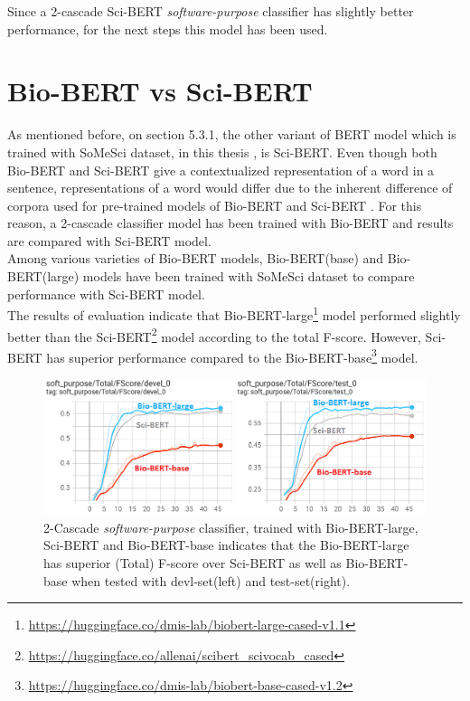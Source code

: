 Since a 2-cascade Sci-BERT \emph{software-purpose} classifier has slightly better performance, for the next steps this model has been used. \\

\section{Bio-BERT vs Sci-BERT}
\label{sec:chapter06:biosci}

As mentioned before, on section 5.3.1, the other variant of BERT model which is trained with SoMeSci dataset, in this thesis , is Sci-BERT. Even though both \ac{Bio-BERT} and \ac{Sci-BERT} give a contextualized representation of a word in a sentence, representations of a word would differ due to the inherent difference of corpora used for pre-trained models of Bio-BERT and Sci-BERT \citep{beltagy2019scibert,li2019fine}. For this reason, a 2-cascade classifier model has been trained with Bio-BERT and results are compared with Sci-BERT model. \\

Among various varieties of Bio-BERT models, Bio-BERT(base) and Bio-BERT(large) models have been trained with SoMeSci dataset to compare performance with Sci-BERT model. \\

The results of evaluation indicate that  Bio-BERT-large\footnote{\url{https://huggingface.co/dmis-lab/biobert-large-cased-v1.1}} model performed slightly better than the Sci-BERT\footnote{\url{https://huggingface.co/allenai/scibert_scivocab_cased}} model according to the total F-score. However, Sci-BERT has superior performance compared to the Bio-BERT-base\footnote{\url{https://huggingface.co/dmis-lab/biobert-base-cased-v1.2}} model. \\

\begin{figure}[htbp]
	\centering
	\includegraphics[width=1\textwidth]{4.graphics/figures/ch_6/6.BIoBERT_vs_SCIBERT_2LAYER_Classifier/HD/BIobert-large-small-cybert}
	\caption{2-Cascade \emph{software-purpose} classifier, trained with Bio-BERT-large, Sci-BERT and Bio-BERT-base indicates that the Bio-BERT-large has superior (Total) F-score over Sci-BERT as well as Bio-BERT-base when tested with devl-set(left) and test-set(right).}
	\label{fig:chapter06:with}
\end{figure}


